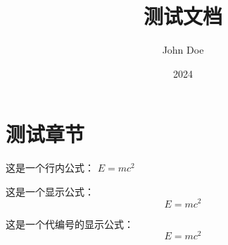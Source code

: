 \documentclass[a4paper,zihao=5]{kaobook}
\title{测试文档}
\author{John Doe}
\date{2024}
\begin{document}
\chapter{测试章节}

这是一个行内公式： $E=mc^2$

这是一个显示公式：
\[ E=mc^2 \]

这是一个代编号的显示公式：
\begin{equation}
    E=mc^2
\end{equation}


\end{document}
